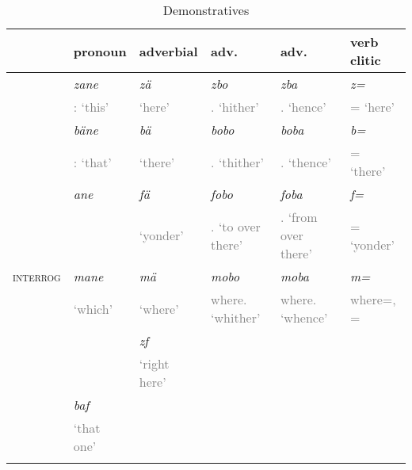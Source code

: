 \begin{table}
\caption{Demonstratives}
\label{demonstratives-table}
	\begin{tabularx}{\textwidth}{lXXXXX}
		\lsptoprule
		&pronoun&adverbial&adv.{\All}&adv.{\Abl}&verb clitic\\ \midrule
		{\Prox}&\emph{zane}&\emph{zä}&\emph{zbo}&\emph{zba}&\emph{z=}\\
		&\textcolor{gray}{\footnotesize{\Dem:{\Prox} `this'}}&\textcolor{gray}{\footnotesize{{\Prox} `here'}}&\textcolor{gray}{\footnotesize{\Prox.{\All} `hither'}}&\textcolor{gray}{\footnotesize{\Prox.{\Abl} `hence'}}&\textcolor{gray}{\footnotesize{\Prox= `here'}}\\
		\Med{}&{\cellcolor[gray]{.90}}\emph{bäne}&\emph{bä}&\emph{bobo}&\emph{boba}&\emph{b=}\\
		&{\cellcolor[gray]{.90}}\textcolor{gray}{\footnotesize{\Dem:\Med{} `that'}}&\textcolor{gray}{\footnotesize{\Med{} `there'}}&\textcolor{gray}{\footnotesize{\Med.{\All} `thither'}}&\textcolor{gray}{\footnotesize{\Med.{\Abl} `thence'}}&\textcolor{gray}{\footnotesize{\Med= `there'}}\\
		{\Dist}&{\cellcolor[gray]{.90}}\emph{ane}&\emph{fä}&\emph{fobo}&\emph{foba}&\emph{f=}\\
		&\textcolor{gray}{{\cellcolor[gray]{.90}}\footnotesize{\Dem~}}&\textcolor{gray}{\footnotesize{{\Dist} `yonder'}}&\textcolor{gray}{\footnotesize{\Dist.{\All} `to over there'}}&\textcolor{gray}{\footnotesize{\Dist.{\Abl} `from over there'}}&\textcolor{gray}{\footnotesize{\Dist= `yonder'}}\\
		\textsc{interrog}&\emph{mane}&\emph{mä}&\emph{mobo}&\emph{moba}&{\cellcolor[gray]{.90}}\emph{m=}\\
		&\textcolor{gray}{\footnotesize{`which'}}&\textcolor{gray}{\footnotesize{`where'}}&\textcolor{gray}{\footnotesize{where.{\All} `whither'}}&\textcolor{gray}{\footnotesize{where.{\Abl} `whence'}}&\textcolor{gray}{{\cellcolor[gray]{.90}}\footnotesize{where=, \Appr=}}\\ \midrule
		{\Imm}&&{\cellcolor[gray]{.90}}\emph{zf}&&&\\
		&&{\cellcolor[gray]{.90}}\textcolor{gray}{\footnotesize{{\Imm} `right here'}}&&&\\
		{\Recog}&{\cellcolor[gray]{.90}}\emph{baf}&&&&\\		
		&{\cellcolor[gray]{.90}}\textcolor{gray}{\footnotesize{{\Recog} `that one'}}&&&&\\
		\lspbottomrule
	\end{tabularx}
\end{table}

